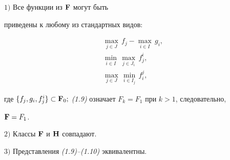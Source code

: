 \begin{thms} %


$1)$ Все функции из $\bold F$ могут быть


приведены к любому из стандартных видов:


\begin{gather}


\max_{j\in J}\, f_j - \max_{i\in I}\, g_i,\\


%


\min_{i\in I}\, \max_{j\in J_i}\, f_j^i,\\


%


\max_{j\in J}\, \min_{i\in I_j}\, f_i^j,


\end{gather}


где $\{f_j, g_i, f_j^i \} \su


\F_0;$ {\em (1.9)} означает $F_k=F_1$ при $k>1$, следовательно,


$\bold F=F_1$.





$2)$ Классы $\bold F$ и $\bold H$ совпадают.





$3)$ Представления {\em (1.9)--(1.10)} эквивалентны.


\end{thms}





